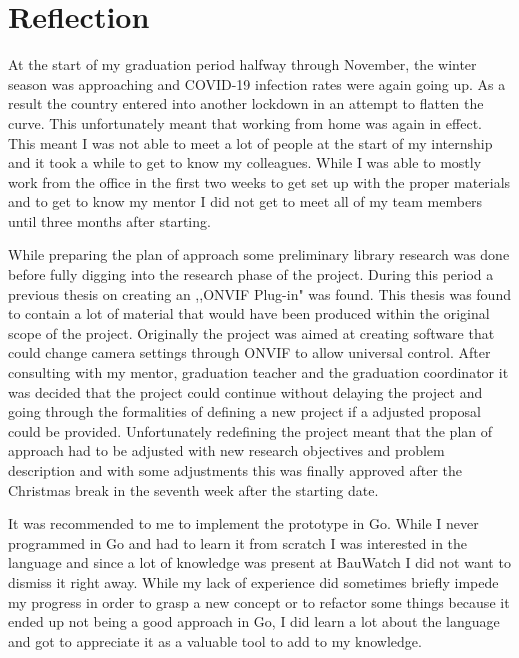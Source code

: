 \chapter{Reflection}
\label{reflection}
At the start of my graduation period halfway through November, the winter season was approaching and COVID-19 infection rates were again going up.
As a result the country entered into another lockdown in an attempt to flatten the curve.
This unfortunately meant that working from home was again in effect.
This meant I was not able to meet a lot of people at the start of my internship and it took a while to get to know my colleagues.
While I was able to mostly work from the office in the first two weeks to get set up with the proper materials and to get to know my mentor I did not get to meet all of my team members until three months after starting.

While preparing the plan of approach some preliminary library research was done before fully digging into the research phase of the project.
During this period a previous thesis on creating an ,,ONVIF Plug-in" \cite{kesteloo_onvif_2016} was found.
This thesis was found to contain a lot of material that would have been produced within the original scope of the project.
Originally the project was aimed at creating software that could change camera settings through ONVIF to allow universal control.
After consulting with my mentor, graduation teacher and the graduation coordinator it was decided that the project could continue without delaying the project and going through the formalities of defining a new project if a adjusted proposal could be provided.
Unfortunately redefining the project meant that the plan of approach had to be adjusted with new research objectives and problem description and with some adjustments this was finally approved after the Christmas break in the seventh week after the starting date.

It was recommended to me to implement the prototype in Go.
While I never programmed in Go and had to learn it from scratch I was interested in the language and since a lot of knowledge was present at BauWatch I did not want to dismiss it right away.
While my lack of experience did sometimes briefly impede my progress in order to grasp a new concept or to refactor some things because it ended up not being a good approach in Go, I did learn a lot about the language and got to appreciate it as a valuable tool to add to my knowledge.


